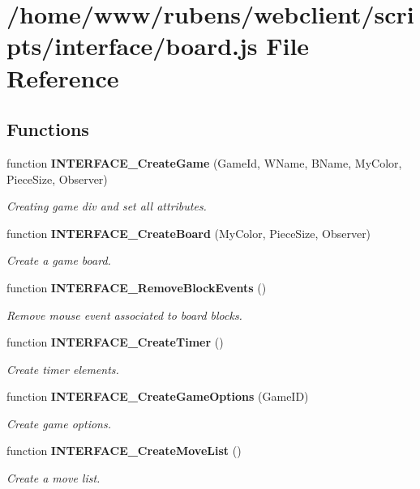 \section{/home/www/rubens/webclient/scripts/interface/board.js File Reference}
\label{board_8js}
\subsection*{Functions}
\begin{CompactItemize}
\item 
function {\bf INTERFACE\_\-CreateGame} (GameId, WName, BName, MyColor, PieceSize, Observer)
\begin{CompactList}\small\item\em Creating game div and set all attributes. \item\end{CompactList}\item 
function {\bf INTERFACE\_\-CreateBoard} (MyColor, PieceSize, Observer)
\begin{CompactList}\small\item\em Create a game board. \item\end{CompactList}\item 
function {\bf INTERFACE\_\-RemoveBlockEvents} ()
\begin{CompactList}\small\item\em Remove mouse event associated to board blocks. \item\end{CompactList}\item 
function {\bf INTERFACE\_\-CreateTimer} ()
\begin{CompactList}\small\item\em Create timer elements. \item\end{CompactList}\item 
function {\bf INTERFACE\_\-CreateGameOptions} (GameID)
\begin{CompactList}\small\item\em Create game options. \item\end{CompactList}\item 
function {\bf INTERFACE\_\-CreateMoveList} ()
\begin{CompactList}\small\item\em Create a move list. \item\end{CompactList}\item 

\end{CompactItemize}
